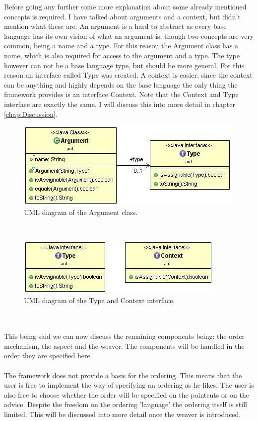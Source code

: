 \documentclass[a4paper]{report}
\begin{document}
Before going any further some more explanation about some already mentioned concepts is required. I have talked about arguments and a context, but didn't mention what these are. An argument is a hard to abstract as every base language has its own vision of what an argument is, though two concepts are very common, being a name and a type. For this reason the Argument class has a name, which is also required for access to the argument and a type. The type however can not be a base language type, but should be more general. For this reason an interface called Type was created. A context is easier, since  the context can be anything and highly depends on the base language the only thing the framework provides is an interface Context. Note that the Context and Type interface are exactly the same, I will discuss this into more detail in chapter \ref{chap:Discussion}.
\begin{figure}[h!]
\centering
\includegraphics[scale=0.7]{images/AOF/Argument.jpg}
\caption{UML diagram of the Argument class.}
\label{fig:Argument}
\end{figure}\\
\begin{figure}[h!]
\centering
\includegraphics[scale=0.7]{images/AOF/Type-Context.jpg}
\caption{UML diagram of the Type and Context interface.}
\label{fig:Type-Context}
\end{figure}\\
\\
This being said we can now discuss the remaining components being: the order mechanism, the aspect and the weaver. The components will be handled in the order they are specified here.\\
\\
The framework does not provide a basis for the ordering. This means that the user is free to implement the way of specifying an ordering as he likes. The user is also free to choose whether the order will be specified on the pointcuts or on the advice. Despite the freedom on the ordering 'language' the ordering itself is still limited. This will be discussed into more detail once the weaver is introduced.\\
\end{document}
